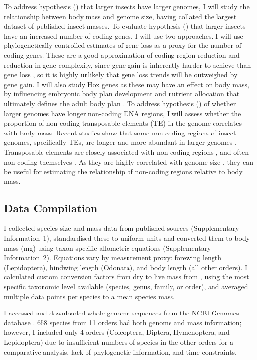 \documentclass[11pt]{article}
\begin{document}
To address hypothesis () that larger insects have larger genomes, I will study the relationship between body mass and genome size, having collated the largest dataset of published insect masses. To evaluate hypothesis () that larger insects have an increased number of coding genes, I will use two approaches. I will use phylogenetically-controlled estimates of gene loss as a proxy for the number of coding genes. These are a good approximation of coding region reduction and reduction in gene complexity, since gene gain is inherently harder to achieve than gene loss \citep{gene-loss-vs-gain-2, evolution-by-gene-loss, geneloss_vs_gain}, so it is highly unlikely that gene loss trends will be outweighed by gene gain. I will also study Hox genes as these may have an effect on body mass, by influencing embryonic body plan development and nutrient allocation that ultimately defines the adult body plan \citep{hox-function, hox-length}. To address hypothesis () of whether larger genomes have longer non-coding DNA regions, I will assess whether the proportion of non-coding transposable elements (TE) in the genome correlates with body mass. Recent studies show that some non-coding regions of insect genomes, specifically TEs, are longer and more abundant in larger genomes \citep{repetitions}. Transposable elements are closely associated with non-coding regions \citep{hadji-te-rna}, and often non-coding themselves \citep{noncodingRNADNA}. As they are highly correlated with genome size \citep{600TEs}, they can be useful for estimating the relationship of non-coding regions relative to body mass. 


\subsection{Data Compilation}
I collected species size and mass data from published sources (Supplementary Information~1), standardised these to uniform units and converted them to body mass (mg) using taxon-specific allometric equations (Supplementary Information~2). Equations vary by measurement proxy: forewing length (Lepidoptera), hindwing length (Odonata), and body length (all other orders). I calculated custom conversion factors from dry to live mass from \cite{drylivemass}, using the most specific taxonomic level available (species, genus, family, or order), and averaged multiple data points per species to a mean species mass.

I accessed and downloaded whole-genome sequences from the NCBI Genomes database \citep{NCBI_Resource_Coordinators2015-iy}. 658 species from 11 orders had both genome and mass information; however, I included only 4 orders (Coleoptera, Diptera, Hymenoptera, and Lepidoptera) due to insufficient numbers of species in the other orders for a comparative analysis, lack of phylogenetic information, and time constraints.
\end{document}
